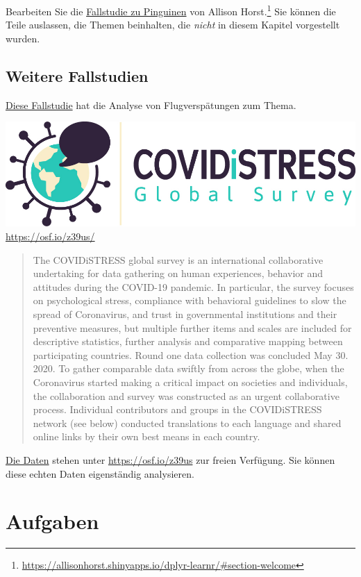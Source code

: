 \documentclass[
  letterpaper,
]{scrbook}
\theoremstyle{definition}
\theoremstyle{definition}
\theoremstyle{definition}
\theoremstyle{remark}
\begin{document}
Bearbeiten Sie die
\href{https://allisonhorst.shinyapps.io/dplyr-learnr/\#section-welcome}{Fallstudie
zu Pinguinen} von Allison Horst.\footnote{\url{https://allisonhorst.shinyapps.io/dplyr-learnr/\#section-welcome}}
Sie können die Teile auslassen, die Themen beinhalten, die \emph{nicht}
in diesem Kapitel vorgestellt wurden.

\subsection{Weitere Fallstudien}\label{weitere-fallstudien}

\href{https://sebastiansauer.github.io/Fallstudie_Flights/}{Diese
Fallstudie} hat die Analyse von Flugverspätungen zum Thema.

\includegraphics[width=0.3\linewidth,height=\textheight,keepaspectratio]{img/Covidistress1.jpg}
\url{https://osf.io/z39us/}

\begin{quote}
The COVIDiSTRESS global survey is an international collaborative
undertaking for data gathering on human experiences, behavior and
attitudes during the COVID-19 pandemic. In particular, the survey
focuses on psychological stress, compliance with behavioral guidelines
to slow the spread of Coronavirus, and trust in governmental
institutions and their preventive measures, but multiple further items
and scales are included for descriptive statistics, further analysis and
comparative mapping between participating countries. Round one data
collection was concluded May 30. 2020. To gather comparable data swiftly
from across the globe, when the Coronavirus started making a critical
impact on societies and individuals, the collaboration and survey was
constructed as an urgent collaborative process. Individual contributors
and groups in the COVIDiSTRESS network (see below) conducted
translations to each language and shared online links by their own best
means in each country.
\end{quote}

\href{https://osf.io/z39us/files/osfstorage}{Die Daten} stehen unter
\url{https://osf.io/z39us} zur freien Verfügung. Sie können diese echten
Daten eigenständig analysieren.

\section{Aufgaben}\label{aufgaben-2}
\end{document}
